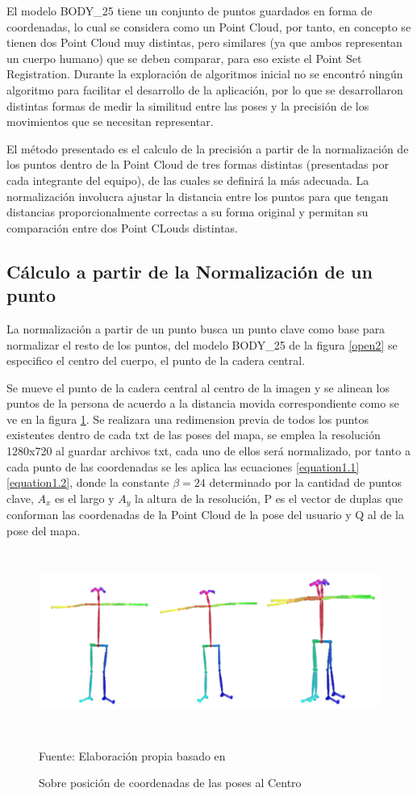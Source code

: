 El modelo BODY\_25 tiene un conjunto de puntos guardados en forma de coordenadas, lo cual se considera como un Point Cloud, por tanto, en concepto se tienen dos Point Cloud muy distintas, pero similares (ya que ambos representan un cuerpo humano) que se deben comparar, para eso existe el Point Set Registration. Durante la exploración de algoritmos inicial no se encontró ningún algoritmo para facilitar el desarrollo de la aplicación, por lo que se desarrollaron distintas formas de medir la similitud entre las poses y la precisión de los movimientos que se necesitan representar.

El método presentado es el calculo de la precisión a partir de la normalización de los puntos dentro de la Point Cloud de tres formas distintas (presentadas por cada integrante del equipo), de las cuales se definirá la más adecuada. La normalización involucra ajustar la distancia entre los puntos para que tengan distancias proporcionalmente correctas a su forma original y permitan su comparación entre dos Point CLouds distintas.


\subsection{Cálculo a partir de la Normalización de un punto}

La normalización a partir de un punto busca un punto clave como base para normalizar el resto de los puntos, del modelo BODY\_25 de la figura \ref{open2} se especifico el centro del cuerpo, el punto de la cadera central.

Se mueve el punto de la cadera central al centro de la imagen y se alinean los puntos de la persona de acuerdo a la distancia movida correspondiente como se ve en la figura \ref{overpose}. Se realizara una redimension previa de todos los puntos existentes dentro de cada txt de las poses del mapa, se emplea la resolución 1280x720 al guardar archivos txt, cada uno de ellos será normalizado, por tanto a cada punto de las coordenadas se les aplica las ecuaciones  \ref{equation1.1} \ref{equation1.2}, donde la constante $\beta = 24$ determinado por la cantidad de puntos clave, $A_x$ es el largo y $A_y$ la altura de la resolución, P es el vector de duplas que conforman las coordenadas de la Point Cloud de la pose del usuario y Q al de la pose del mapa.
\begin{figure}[t!]
	\centering
	\includegraphics[width=14cm,height=6cm,]{./Images/overpose.png}
	\caption{Sobre posición de coordenadas de las poses al Centro}
	\footnotesize Fuente: Elaboración propia basado en \cite{8765346}
	\label{overpose}
\end{figure}

